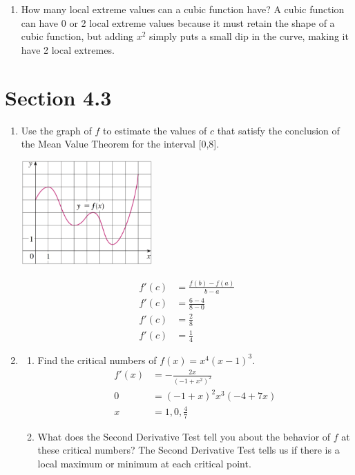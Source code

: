 \documentclass{article}
\begin{document}
\begin{enumerate}
\begin{enumerate}
			\item How many local extreme values can a cubic function have?\newline
			A cubic function can have 0 or 2 local extreme values because it must retain the shape of a cubic function, but adding $x^2$ simply puts a small dip in the curve, making it have 2 local extremes.
		\end{enumerate}
\end{enumerate}

\section{Section 4.3}

\begin{enumerate}
	\item Use the graph of $f$ to estimate the values of $c$ that satisfy the conclusion of the Mean Value Theorem for the interval [0,8].
	\begin{center}
		\includegraphics[width=5cm]{images/43pr1.png}
	\end{center}
	$$\begin{align}
		f'(c)&=\frac{f(b)-f(a)}{b-a}\\
		f'(c)&=\frac{6-4}{8-0}\\
		f'(c)&=\frac{2}{8}\\
		f'(c)&=\frac{1}{4}
	\end{align}$$
\setcounter{enumi}{19}
	\item 
		\begin{enumerate}
			\item Find the critical numbers of $f(x)=x^4(x-1)^3$.
			$$\begin{align}
				f'(x)&=-\frac{2x}{(-1+x^2)^2}\\
				0&=(-1+x)^2x^3(-4+7x)\\
				x&=1,0,\frac{4}{7}
			\end{align}$$
			\item What does the Second Derivative Test tell you about the behavior of $f$ at these critical numbers?\newline
			The Second Derivative Test tells us if there is a local maximum or minimum at each critical point.

\end{enumerate}
\end{enumerate}
\end{document}
